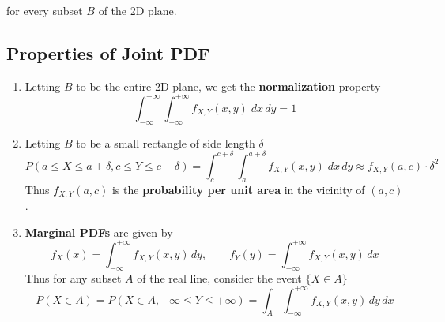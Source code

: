 for every subset $B$ of the 2D plane.
\subsection{Properties of Joint PDF}
\begin{enumerate}
    \item Letting $B$ to be the entire 2D plane, we get the \textbf{normalization} property
    \[\int_{-\infty}^{+\infty}\int_{-\infty}^{+\infty}f_{X,Y}(x,y) \; dx \, dy = 1\]
    \item Letting $B$ to be a small rectangle of side length $\delta$
    \[P(a\le X \le a+\delta, c \le Y \le c+\delta) = \int_{c}^{c+\delta}\int_{a}^{a+\delta}f_{X,Y}(x,y) \; dx \, dy \approx f_{X,Y}(a,c) \cdot \delta^2\]
    Thus $f_{X,Y}(a,c)$ is the \textbf{probability per unit area} in the vicinity of $(a,c)$.
    \item \textbf{Marginal PDFs} are given by
    \[f_X(x)=\int_{-\infty}^{+\infty}f_{X,Y}(x,y) \, dy, \qquad f_Y(y)=\int_{-\infty}^{+\infty}f_{X,Y}(x,y) \, dx\]
    Thus for any subset $A$ of the real line, consider the event $\{X\in A\}$
    \[P(X\in A)=P(X\in A,-\infty \le Y \le +\infty) = \int_A \int_{-\infty}^{+\infty} f_{X,Y}(x,y) \, dy \, dx\]
\end{enumerate}

